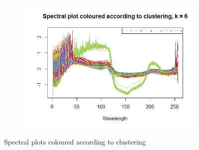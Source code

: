 \documentclass[12pt]{article}
\begin{document}
\begin{figure}[h!]
\begin{subfigure}[b]{0.33\linewidth}
 \includegraphics[width=\textwidth]{../images/project2/spectraByClusters_pam6.png}
 \caption{}\label{fig:spectraByClusters_pam6}
\end{subfigure}%
\caption{Spectral plots coloured according to clustering}
\label{fig:spectraByClusters}
\end{figure}
\end{document}
